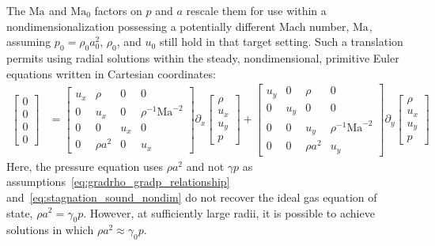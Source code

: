 \documentclass[letterpaper,11pt,nointlimits,reqno]{amsart}
\newcommand{\Mach}[1][]{\mbox{Ma}_{#1}}
\begin{document}
%
The $\Mach$ and $\Mach[0]{}$ factors on $p$ and $a$ rescale them for use within
a nondimensionalization possessing a potentially different Mach number,
$\Mach$, assuming $p_0 = \rho_0 a_0^2$, $\rho_0$, and $u_0$ still hold in that
target setting.  Such a translation permits using radial solutions within the
steady, nondimensional, primitive Euler equations written in Cartesian
coordinates:
%
\begin{align}
  \begin{bmatrix} 0 \\ 0 \\ 0 \\ 0 \end{bmatrix}
&=
  \begin{bmatrix}
     u_x  &  \rho      &  0    &  0                    \\
     0    &  u_x       &  0    &  \rho^{-1}\Mach^{-2}  \\
     0    &  0         &  u_x  &  0                    \\
     0    &  \rho{}a^2 &  0    &  u_x
  \end{bmatrix}
  \partial_x
  \begin{bmatrix} \rho \\ u_x \\ u_y \\ p \end{bmatrix}
+
  \begin{bmatrix}
     u_y  &  0    &  \rho       &  0                    \\
     0    &  u_y  &  0          &  0                    \\
     0    &  0    &  u_y        &  \rho^{-1}\Mach^{-2}  \\
     0    &  0    &  \rho{}a^2  &  u_y
  \end{bmatrix}
  \partial_y
  \begin{bmatrix} \rho \\ u_x \\ u_y \\ p \end{bmatrix}
\end{align}
%
Here, the pressure equation uses $\rho{}a^2$ and not $\gamma{}p$ as
assumptions~\eqref{eq:gradrho_gradp_relationship}
and~\eqref{eq:stagnation_sound_nondim} do not recover the ideal gas equation of
state, $\rho{}a^2=\gamma_{0} p$.  However, at sufficiently large radii, it is
possible to achieve solutions in which $\rho a^2 \approx \gamma_{0} p$.
\end{document}
